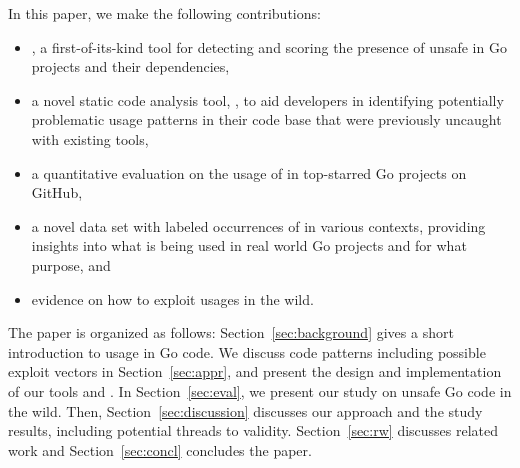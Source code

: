 In this paper, we make the following contributions:

\begin{itemize}
\item \toolUsage{}, a first-of-its-kind tool for detecting and scoring the presence of unsafe in Go projects and their dependencies,
\item a novel static code analysis tool, \toolSA{}, to aid developers in identifying potentially problematic \unsafe{} usage patterns in their code base that were previously uncaught with existing tools,
\item a quantitative evaluation on the usage of \unsafe{} in \projsAnalyzed{} top-starred Go projects on GitHub,
\item a novel data set with  labeled occurrences of \unsafe{} in various contexts, providing insights into what is being used in real world Go projects and for what purpose, and
\item evidence on how to exploit \unsafe{} usages in the wild.
\end{itemize}

The paper is organized as follows:
Section~\ref{sec:background} gives a short introduction to \unsafe{} usage in Go code.
We discuss \unsafe{} code patterns including possible exploit vectors in Section~\ref{sec:appr}, and present the design and implementation of our tools \toolUsage{} and \toolSA{}. 
In Section~\ref{sec:eval}, we present our study on unsafe Go code in the wild.
Then, Section~\ref{sec:discussion} discusses our approach and the study results, including potential threads to validity.
Section~\ref{sec:rw} discusses related work and Section~\ref{sec:concl} concludes the paper.